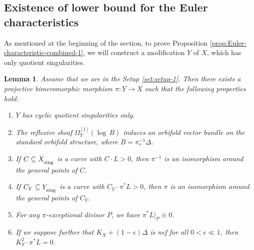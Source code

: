 \documentclass[12pt]{amsart}
\newcommand{\<}{\leq}
\newcommand{\D}{\Delta}
\newtheorem{lemma}[theorem]{Lemma}
\theoremstyle{remark}
\theoremstyle{definition}
\theoremstyle{definition}
\numberwithin{equation}{section}
\theoremstyle{definition}
\theoremstyle{definition}
\def\sing{\operatorname{\textsubscript{\rm sing}}}
\begin{document}
 
\subsection{Existence of lower bound for the Euler characteristics}
 


As mentioned at the beginning of the section, to prove Proposition \ref{prop:Euler-characteristic-combined-1},   we will construct a modification $Y$ of $X$, which has only quotient singularities.

\begin{lemma}
\label{lemma:construction-of-Y-1}
Assume that we are in the Setup \ref{set:setup-1}. 
Then there exists a  projective bimeromorphic morphism $\pi\colon Y \to X$ such that the following properties hold:  
\begin{enumerate}
\item $Y$ has cyclic quotient singularities only. 
\item The reflexive sheaf $\Omega_Y^{[1]}(\log\, B)$ induces an orbifold vector bundle on the standard orbifold structure, where $B=\pi_*^{-1}\Delta$. 
\item If $C\subseteq X_{\sing}$ is a curve with $C\cdot L >0$, then $\pi^{-1}$ is an isomorphism  around the general points of $C$.
\item If $C_Y\subseteq Y_{\sing}$ is a curve with    $C_Y \cdot \pi^* L >0$, 
then $\pi$ is an isomorphism around the general points of $C_Y$. 
\item For any $\pi$-exceptional divisor $P$, we have $\pi^*L|_P \equiv 0$.
\item If we suppose further that $K_X+(1-\epsilon)\D$ is nef for all $0<\epsilon\ll 1$, then  $K_Y^2 \cdot \pi^*L = 0$. 
\end{enumerate}
\end{lemma}
\end{document}
